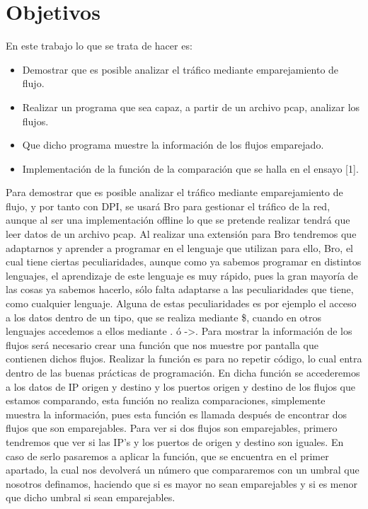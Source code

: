 \chapter{Objetivos}
En este trabajo lo que se trata de hacer es:
\begin{itemize}
\item Demostrar que es posible analizar el tráfico mediante emparejamiento de flujo.
\item Realizar un programa que sea capaz, a partir de un archivo pcap, analizar los flujos.
\item Que dicho programa muestre la información de los flujos emparejado.
\item Implementación de la función de la comparación que se halla en el ensayo [1].
\end{itemize}

Para demostrar que es posible analizar el tráfico mediante emparejamiento 
de flujo, y por tanto con DPI, se usará Bro para gestionar el tráfico de 
la red, aunque al ser una implementación offline lo que se pretende realizar 
tendrá que leer datos de un archivo pcap.
\intro
Al realizar una extensión para Bro tendremos que adaptarnos y aprender a 
programar en el lenguaje que utilizan para ello, Bro, el cual tiene ciertas 
peculiaridades, aunque como ya sabemos programar en distintos lenguajes, el 
aprendizaje de este lenguaje es muy rápido, pues la gran mayoría de las cosas 
ya sabemos hacerlo, sólo falta adaptarse a las peculiaridades que tiene, como 
cualquier lenguaje. Alguna de estas peculiaridades es por ejemplo el acceso a 
los datos dentro de un tipo, que se realiza mediante \$, cuando en otros 
lenguajes accedemos a ellos mediante . ó ->.
\intro
Para mostrar la información de los flujos será necesario crear una función 
que nos muestre por pantalla que contienen dichos flujos. Realizar la función 
es para no repetir código, lo cual entra dentro de las buenas prácticas de 
programación. En dicha función se accederemos a los datos de IP origen y 
destino y los puertos origen y destino de los flujos que estamos comparando, 
esta función no realiza comparaciones, simplemente muestra la información, 
pues esta función es llamada después de encontrar dos flujos que son emparejables.
\intro
Para ver si dos flujos son emparejables, primero tendremos que ver si las IP’s 
y los puertos de origen y destino son iguales. En caso de serlo pasaremos a 
aplicar la función, que se encuentra en el primer apartado, la cual nos devolverá 
un número que compararemos con un umbral que nosotros definamos, haciendo que 
si es mayor no sean emparejables y si es menor que dicho umbral si sean emparejables.